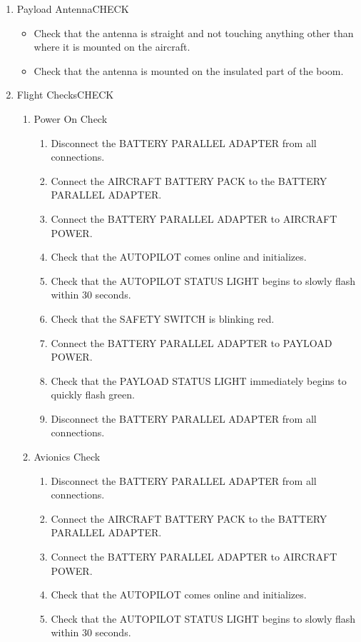 \documentclass{report}
\begin{document}
\begin{enumerate}
\begin{enumerate}
				\end{enumerate}
			\item Payload Antenna\hrulefill CHECK
				\begin{itemize}
					\item Check that the antenna is straight and not touching anything other than where it is mounted on the aircraft.
					\item Check that the antenna is mounted on the insulated part of the boom.
				\end{itemize}
			\item Flight Checks\hrulefill CHECK
				\begin{enumerate}
					\item Power On Check
						\begin{enumerate}
							\item Disconnect the BATTERY PARALLEL ADAPTER from all connections.
							\item Connect the AIRCRAFT BATTERY PACK to the BATTERY PARALLEL ADAPTER.
							\item Connect the BATTERY PARALLEL ADAPTER to AIRCRAFT POWER.
							\item Check that the AUTOPILOT comes online and initializes.
							\item Check that the AUTOPILOT STATUS LIGHT begins to slowly flash within 30 seconds.
							\item Check that the SAFETY SWITCH is blinking red.
							\item Connect the BATTERY PARALLEL ADAPTER to PAYLOAD POWER.
							\item Check that the PAYLOAD STATUS LIGHT immediately begins to quickly flash green.
							\item Disconnect the BATTERY PARALLEL ADAPTER from all connections.
						\end{enumerate}
					\item Avionics Check
						\begin{enumerate}
							\item Disconnect the BATTERY PARALLEL ADAPTER from all connections.
							\item Connect the AIRCRAFT BATTERY PACK to the BATTERY PARALLEL ADAPTER.
							\item Connect the BATTERY PARALLEL ADAPTER to AIRCRAFT POWER.
							\item Check that the AUTOPILOT comes online and initializes.
							\item Check that the AUTOPILOT STATUS LIGHT begins to slowly flash within 30 seconds.

\end{enumerate}
\end{enumerate}
\end{enumerate}
\end{document}
